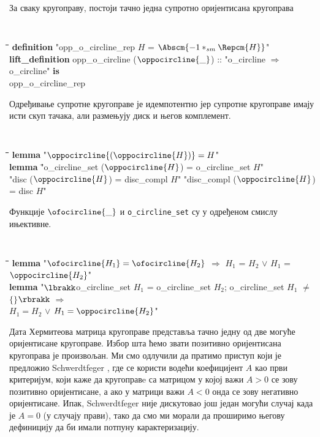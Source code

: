 За сваку кругоправу, постоји тачно једна супротно оријентисана
кругоправа
{\tt
  \begin{tabbing}
    \hspace{5mm}\=\hspace{5mm}\=\hspace{5mm}\=\hspace{5mm}\=\hspace{5mm}\=\kill
{\bf definition} "opp\_o\_circline\_rep $H$ = $\Abscm{-1 *_{sm} \Repcm{H}}$"\\
{\bf lift\_definition} opp\_o\_circline ($\oppocircline{\_}$) :: "o\_circline $\Rightarrow$ o\_circline" {\bf is} \\
\>opp\_o\_circline\_rep
  \end{tabbing}
}
\noindent Одређивање супротне кругоправе је идемпотентно јер супротне
кругоправе имају исти скуп тачака, али размењују диск и његов
комплемент.  {\tt
  \begin{tabbing}
    \hspace{5mm}\=\hspace{5mm}\=\hspace{5mm}\=\hspace{5mm}\=\hspace{5mm}\=\kill
{\bf lemma} "$\oppocircline{(\oppocircline{H})} = H$"\\
{\bf lemma} \="o\_circline\_set ($\oppocircline{H}$) = o\_circline\_set $H$"\\
\>"disc ($\oppocircline{H}$) = disc\_compl $H$" "disc\_compl ($\oppocircline{H}$) = disc $H$"
  \end{tabbing}
}

Функције $\ofocircline{\_}$ и {\tt o\_circline\_set} су у одређеном
смислу ињективне.  {\tt
  \begin{tabbing}
    \hspace{5mm}\=\hspace{5mm}\=\hspace{5mm}\=\hspace{5mm}\=\hspace{5mm}\=\kill
{\bf lemma} "$\ofocircline{H_1} = \ofocircline{H_2}$ $\Longrightarrow$ $H_1$ = $H_2$ $\vee$ $H_1$ = $\oppocircline{H_2}$"\\
{\bf lemma} "$\lbrakk$o\_circline\_set $H_1$ = o\_circline\_set $H_2$; o\_circline\_set $H_1$ $\neq$ $\{\}$$\rbrakk$ $\Longrightarrow$ \\
\> $H_1 = H_2$ $\vee$ $H_1 = \oppocircline{H_2}$"
  \end{tabbing}
}

Дата Хермитеова матрица кругоправе представља тачно једну од две
могуће оријентисане кругоправе. Избор шта ћемо звати позитивно
оријентисана кругоправа је произвољан. Ми смо одлучили да пратимо
приступ који је предложио Schwerdtfeger \cite{schwerdtfeger}, где се
користи водећи коефицијент $A$ као први критеријум, који каже да
кругоправe са матрицом у којој важи $A > 0$ се зову позитивно
оријентисане, а ако у матрици важи $A < 0$ онда се зову негативно
оријентисане.  Ипак, Schwerdtfeger није дискутовао још један могући
случај када је $A = 0$ (у случају прави), тако да смо ми морали да
проширимо његову дефиницију да би имали потпуну карактеризацију.

